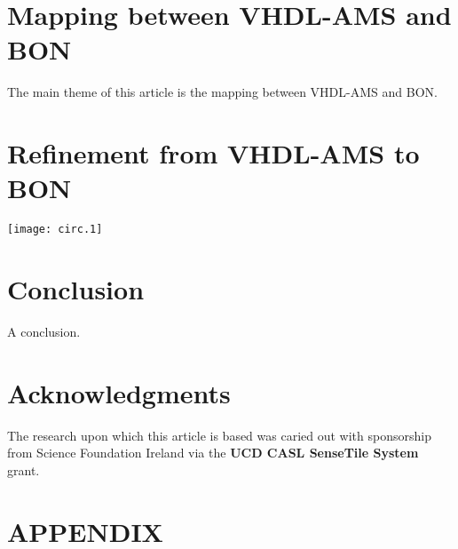 \documentclass{article}
\begin{document}
\section{Mapping between VHDL-AMS and BON}
\label{sec:mappingVB}
The main theme of this article is the mapping between VHDL-AMS and BON.
\section{Refinement from VHDL-AMS to BON }
\label{sec:refVB}
\texttt{[image: circ.1]}

\section{Conclusion}

A conclusion.

\section {Acknowledgments}
The research upon which this article is based was caried out with
sponsorship from Science Foundation Ireland via the
\textbf{UCD CASL SenseTile System} grant.






\appendix
\newpage
\section {APPENDIX}
























\end{document}
